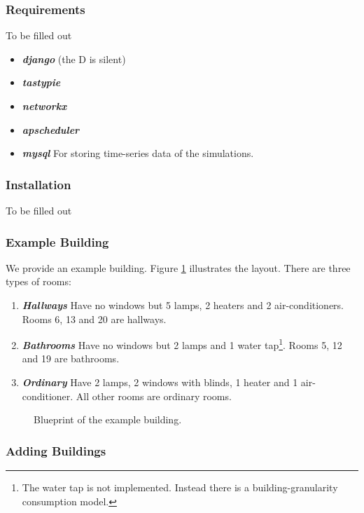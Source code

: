 \documentclass[10pt]{article}
\newcommand{\includeSVG}[1]{
  \texttt{[image: figs/\#1.pdf]}
}
\newcommand{\textdesc}[1]{\textit{\textbf{#1}}} %
\newcommand{\descitem}[1]{\item \textdesc{#1}}
\begin{document}
\subsubsection{Requirements}


To be filled out
\begin{itemize}
  \descitem{django} (the D is silent)
  \descitem{tastypie}
  \descitem{networkx}
  \descitem{apscheduler}
  \descitem{mysql} For storing time-series data of the simulations.
\end{itemize}

\subsubsection{Installation}


To be filled out

\subsubsection{Example Building}

We provide an example building. Figure \ref{fig:building:example} illustrates the layout. There are three types of rooms:
\begin{enumerate}
  \descitem{Hallways} Have no windows but 5 lamps, 2 heaters and 2 air-conditioners. Rooms 6, 13 and 20 are hallways.
  \descitem{Bathrooms} Have no windows but 2 lamps and 1 water tap\footnote{The water tap is not implemented. Instead there is a building-granularity consumption model.}. Rooms 5, 12 and 19 are bathrooms.
  \descitem{Ordinary} Have 2 lamps, 2 windows with blinds, 1 heater and 1 air-conditioner. All other rooms are ordinary rooms.
\end{enumerate}

\begin{figure}[htbp]
  \begin{center}
    \rotatebox{0}{\scalebox{1.0}{\includeSVG{building0}}}
  \end{center}
  \caption{Blueprint of the example building.}
  \label{fig:building:example}
\end{figure}

\subsubsection{Adding Buildings}
\end{document}
